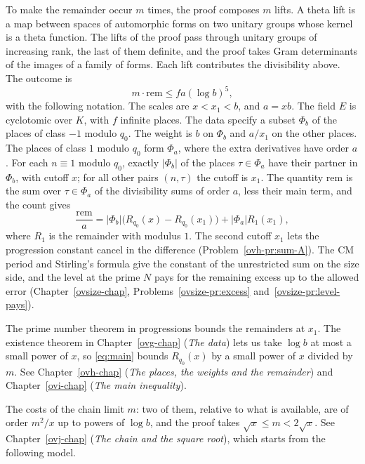 \documentclass[reqno]{amsart}
\newcounter{chap}
\theoremstyle{definition}
\newcommand{\rem}{\mathrm{rem}}
\begin{document}
To make the remainder occur \(m\) times, the proof composes \(m\)
lifts.  A theta lift is a map between spaces of automorphic forms
on two unitary groups whose kernel is a theta function.  The lifts
of the proof pass through unitary groups of increasing rank, the
last of them definite, and the proof takes Gram determinants of
the images of a family of forms.  Each lift contributes the
divisibility above.  The outcome is
\begin{equation}\label{eq:main}
  m \cdot \rem \le f a (\log b)^5 ,
\end{equation}
with the following notation.  The scales are \(x < x_1 < b\), and
\(a = xb\).  The field \(E\) is cyclotomic over \(K\), with \(f\)
infinite places.  The data specify a subset \(\Phi_b\) of the places
of class \(-1\) modulo \(q_0\).  The weight is \(b\) on \(\Phi_b\) and
\(a/x_1\) on the other places.  The places of class \(1\) modulo \(q_0\)
form \(\Phi_a\), where the extra derivatives have order \(a\).  For each
\(n \equiv 1\) modulo \(q_0\), exactly \(\lvert \Phi_b \rvert\) of
the places \(\tau \in \Phi_a\) have their partner in \(\Phi_b\),
with cutoff \(x\); for all other pairs \((n, \tau)\) the cutoff is
\(x_1\).  The quantity \(\rem\) is the sum over \(\tau \in \Phi_a\)
of the divisibility sums of order \(a\), less their main term, and
the count gives
\begin{equation}\label{eq:rem}
  \frac{\rem}{a} = \lvert \Phi_b \rvert \bigl( R_{q_0}(x) - R_{q_0}(x_1) \bigr)
  + \lvert \Phi_a \rvert R_1(x_1) ,
\end{equation}
where \(R_1\) is the remainder with modulus \(1\).
The second cutoff \(x_1\) lets the progression constant cancel in
the difference (Problem~\ref{ovh-pr:sum-A}).  The CM period and
Stirling's formula give the constant of the unrestricted sum on
the size side, and the level at the prime \(N\) pays for the
remaining excess up to the allowed error (Chapter~\ref{ovsize-chap},
Problems~\ref{ovsize-pr:excess} and~\ref{ovsize-pr:level-pays}).

The prime number theorem in progressions bounds the remainders at
\(x_1\).  The existence theorem in Chapter~\ref{ovg-chap} (\emph{The data}) lets us
take \(\log b\) at most a small power of \(x\), so \eqref{eq:main}
bounds \(R_{q_0}(x)\) by a small power of \(x\) divided by \(m\).
See Chapter~\ref{ovh-chap} (\emph{The places, the weights and the remainder}) and
Chapter~\ref{ovi-chap} (\emph{The main inequality}).

The costs of the chain limit \(m\): two of them, relative to what
is available, are of order \(m^2/x\) up to powers of \(\log b\), and
the proof takes \(\sqrt{x} \le m < 2\sqrt{x}\).  See
Chapter~\ref{ovj-chap} (\emph{The chain and the square root}), which
starts from the following model.
\end{document}
